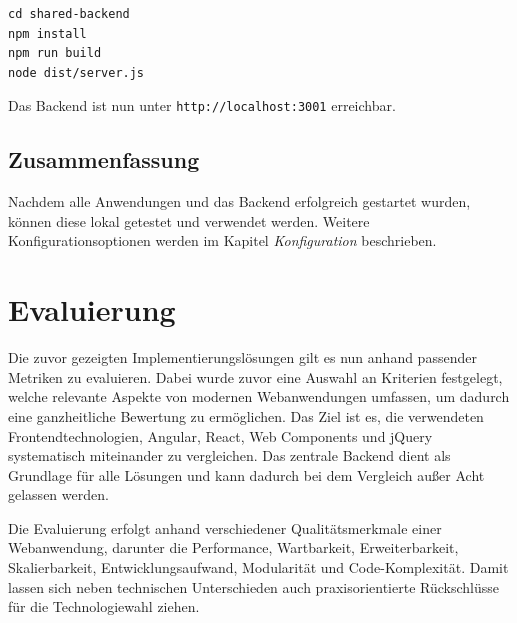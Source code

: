 \documentclass[oneside]{ausarbeitung}
\begin{document}
\begin{verbatim}
cd shared-backend
npm install
npm run build
node dist/server.js
\end{verbatim}

Das Backend ist nun unter \texttt{http://localhost:3001} erreichbar.

\section{Zusammenfassung}
Nachdem alle Anwendungen und das Backend erfolgreich gestartet wurden, können diese lokal getestet und verwendet werden. Weitere Konfigurationsoptionen werden im Kapitel \textit{Konfiguration} beschrieben.

\chapter{Evaluierung}

Die zuvor gezeigten Implementierungslösungen gilt es nun anhand passender Metriken zu evaluieren. Dabei wurde zuvor eine Auswahl an Kriterien festgelegt, welche relevante Aspekte von modernen Webanwendungen umfassen, um dadurch eine ganzheitliche Bewertung zu ermöglichen. Das Ziel ist es, die verwendeten Frontendtechnologien, Angular, React, Web Components und jQuery systematisch miteinander zu vergleichen. Das zentrale Backend dient als Grundlage für alle Lösungen und kann dadurch bei dem Vergleich außer Acht gelassen werden.

Die Evaluierung erfolgt anhand verschiedener Qualitätsmerkmale einer Webanwendung, darunter die Performance, Wartbarkeit, Erweiterbarkeit, Skalierbarkeit, Entwicklungsaufwand, Modularität und Code-Komplexität. Damit lassen sich neben technischen Unterschieden auch praxisorientierte Rückschlüsse für die Technologiewahl ziehen. 
\end{document}
